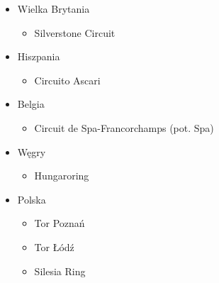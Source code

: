 \documentclass[../Kamil_Kowalewski_Main.tex]{subfiles}
\begin{document}
{{{\begin{itemize}[noitemsep,topsep=0pt]
                \item Wielka Brytania
                \begin{itemize}[noitemsep,topsep=0pt]
                    \item Silverstone Circuit
                \end{itemize}

                \item Hiszpania
                \begin{itemize}[noitemsep,topsep=0pt]
                    \item Circuito Ascari
                \end{itemize}

                \item Belgia
                \begin{itemize}[noitemsep,topsep=0pt]
                    \item Circuit de Spa-Francorchamps (pot. Spa)
                \end{itemize}

                \item Węgry
                \begin{itemize}[noitemsep,topsep=0pt]
                    \item Hungaroring
                \end{itemize}

                \item Polska
                \begin{itemize}[noitemsep,topsep=0pt]
                    \item Tor Poznań
                    \item Tor Łódź
                    \item Silesia Ring
                \end{itemize}
            \end{itemize}
        }
    }

}
\end{document}
